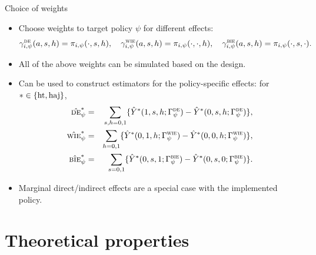 \documentclass[aspectratio=169]{beamer}
\newcommand{\de}{\textsc{de}}
\newcommand{\bie}{\textsc{bie}}
\newcommand{\wie}{\textsc{wie}}
\newcommand{\horthom}{\textup{ht}}
\newcommand{\haj}{\textup{haj}}
\begin{document}
\begin{frame}{Choice of weights}
\begin{itemize}
    \item Choose weights to target policy \(\psi\) for different effects: 
    {\small 
  \[
    \gamma^{\de}_{i,\psi}(a,s,h)=\pi_{i,\psi}(\cdot,s,h),\quad
    \gamma^{\wie}_{i,\psi}(a,s,h)=\pi_{i,\psi}(\cdot,\cdot,h),\quad
    \gamma^{\bie}_{i,\psi}(a,s,h)=\pi_{i,\psi}(\cdot,s,\cdot).
  \]}\pause 
   \item All of the above weights can be simulated based on the design.
\pause   

  \item Can be used to construct estimators for the policy-specific effects: for \(*\in\{\horthom,\haj\}\),
  {\small 
  \begin{eqnarray*}
    \hat{\de}_{\psi}^{*} &=& \sum_{s,h=0,1} \{\hat{Y}^{*}(1,s,h;\Gamma_{\psi}^{\de})  - \hat{Y}^{*}(0,s,h;\Gamma_{\psi}^{\de})\}, \\
    \hat{\wie}_{\psi}^{*} &=& \sum_{h=0,1} \{\hat{Y}^{*}(0,1,h;\Gamma_{\psi}^{\wie}) - \hat{Y}^{*}(0,0,h;\Gamma_{\psi}^{\wie})\}, \\
    \hat{\bie}_{\psi}^{*} &=& \sum_{s=0,1} \{\hat{Y}^{*}(0,s,1;\Gamma_{\psi}^{\bie}) - \hat{Y}^{*}(0,s,0;\Gamma_{\psi}^{\bie})\}.
\end{eqnarray*}
} 
\pause 

    \item Marginal direct/indirect effects are a special case with the implemented policy. 
\end{itemize}
    
\end{frame}


\section{Theoretical properties}
\end{document}
